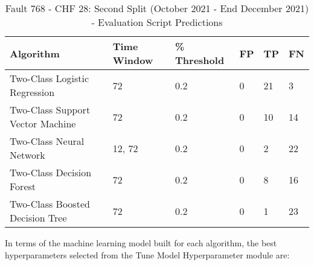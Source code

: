 \begin{table}[!ht]
    \centering
    \begin{tabular}{|l|l|l|l|l|l|}
    \hline
        Algorithm & Time Window & \% Threshold & FP & TP & FN \\ \hline
        Two-Class Logistic Regression & 72 & 0.2 & 0 & 21 & 3 \\ \hline
        Two-Class Support Vector Machine & 72 & 0.2 & 0 & 10 & 14 \\ \hline
        Two-Class Neural Network & 12, 72 & 0.2 & 0 & 2 & 22 \\ \hline
        Two-Class Decision Forest & 72 & 0.2 & 0 & 8 & 16 \\ \hline
        Two-Class Boosted Decision Tree & 72 & 0.2 & 0 & 1 & 23 \\ \hline
    \end{tabular}
    \caption{Fault 768 - CHF 28: Second Split (October 2021 - End December 2021) - Evaluation Script Predictions}
    \label{9112_SCA34_1st}
\end{table}

In terms of the machine learning model built for each algorithm, the best hyperparameters selected from the Tune Model Hyperparameter module are:

